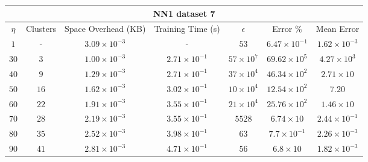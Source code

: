 \begin{adjustwidth}{-1cm}{}
\begin{tabular}{ccccccc}
\hline
\multicolumn{7}{c}{NN1 dataset 7} \\
\toprule
$\eta$ & Clusters & Space Overhead (KB) & Training Time (s) & $\epsilon$ & Error \% & Mean Error\\
\midrule
$1$ & - & $3.09 \times 10^{-3}$ & - & $53$ & $6.47 \times 10^{-1}$ & $1.62 \times 10^{-3}$\\
$30$ & $3$ & $1.00 \times 10^{-3}$ & $2.71 \times 10^{-1}$ & $57 \times 10^7$ & $69.62 \times 10^5$ & $4.27 \times 10^3$\\
$40$ & $9$ & $1.29 \times 10^{-3}$ & $2.71 \times 10^{-1}$ & $37 \times 10^4$ & $46.34 \times 10^2$ & $2.71 \times 10$\\
$50$ & $16$ & $1.62 \times 10^{-3}$ & $3.02 \times 10^{-1}$ & $10 \times 10^4$ & $12.54 \times 10^2$ & $7.20$\\
$60$ & $22$ & $1.91 \times 10^{-3}$ & $3.55 \times 10^{-1}$ & $21 \times 10^4$ & $25.76 \times 10^2$ & $1.46 \times 10$\\
$70$ & $28$ & $2.19 \times 10^{-3}$ & $3.55 \times 10^{-1}$ & $5528$ & $6.74  \times 10$ & $2.44 \times 10^{-1}$\\
$80$ & $35$ & $2.52 \times 10^{-3}$ & $3.98 \times 10^{-1}$ & $63$ & $7.7 \times 10^{-1}$ & $2.26 \times 10^{-3}$\\
$90$ & $41$ & $2.81 \times 10^{-3}$ & $4.71 \times 10^{-1}$ & $56$ & $6.8  \times 10$ & $1.82 \times 10^{-3}$\\
\bottomrule
\end{tabular}
\end{adjustwidth}

\par\null\par
\par\null\par

